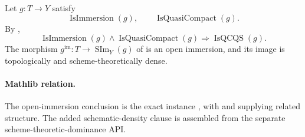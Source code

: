 \begin{lemma}
  \label{lemma:nagata-immersion-open-in-scheme-image}

  Let $g\colon T\to Y$ satisfy
  \[
    \operatorname{IsImmersion}(g),
    \qquad
    \operatorname{IsQuasiCompact}(g).
  \]
  By ,
  \[
    \operatorname{IsImmersion}(g)\wedge
      \operatorname{IsQuasiCompact}(g)
        \Longrightarrow\operatorname{IsQCQS}(g).                 \tag{IO-1}
  \]
  The morphism
  $g^{\mathrm{im}}\colon T\to\operatorname{SIm}_Y(g)$ of
   is an open immersion,
  and its image is topologically and scheme-theoretically dense.

  \paragraph{Mathlib relation.}
  The open-immersion conclusion is the exact instance
  \texttt{},
  with \texttt{} and
  \texttt{} supplying
  related structure.  The added schematic-density clause is assembled from
  the separate scheme-theoretic-dominance API.
\end{lemma}

